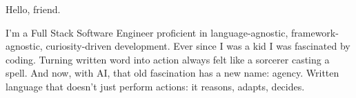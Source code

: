 %
%
%
\par{
Hello, friend.

I'm a Full Stack Software Engineer proficient in language-agnostic, framework-agnostic, curiosity-driven development. Ever since I was a kid I was fascinated by coding. Turning written word into action always felt like a sorcerer casting a spell. And now, with AI, that old fascination has a new name: agency. Written language that doesn't just perform actions: it reasons, adapts, decides.
}